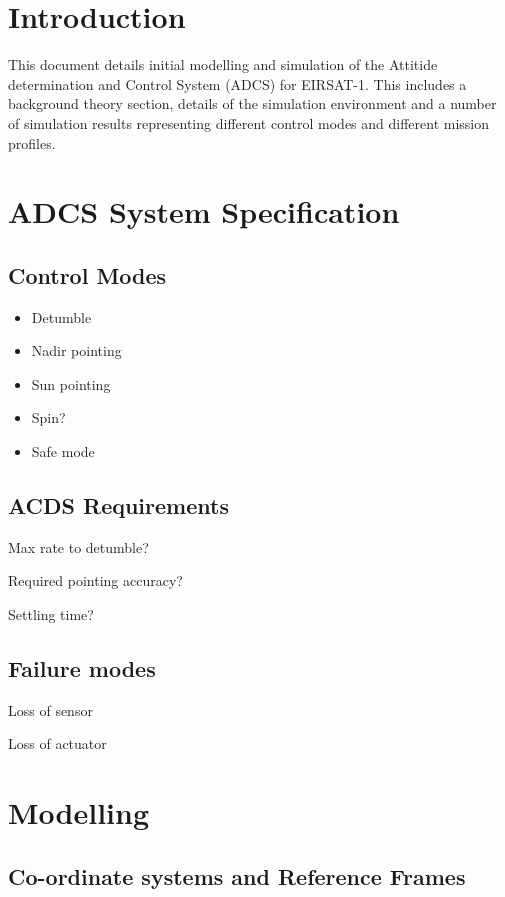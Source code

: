 
\section{Introduction}
This document details initial modelling and simulation of the Attitide determination and Control System (ADCS) for EIRSAT-1.
This includes a background theory section, details of the simulation environment and a number of simulation results representing different control modes and different mission profiles.

\section{ADCS System Specification}

\subsection{Control Modes}
\begin{itemize}
\item Detumble
\item Nadir pointing
\item Sun pointing
\item Spin?
\item Safe mode
\end{itemize}

\subsection{ACDS Requirements}

Max rate to detumble?

Required pointing accuracy?

Settling time?

\subsection{Failure modes}

Loss of sensor

Loss of actuator

\section{Modelling}
\subsection{Co-ordinate systems and Reference Frames}

